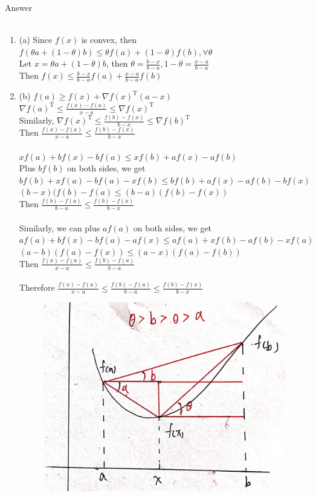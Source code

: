 \documentclass{article}
\theoremstyle{definition}
\theoremstyle{definition}
\theoremstyle{remark}
\begin{document}
{\bf{Answer
    \\\\\begin{enumerate}
    \item (a)  Since $f(x)$ is convex, then $f(\theta a+(1-\theta)b)\leq\theta f(a)+(1-\theta)f(b), \forall \theta$
    \\Let $x=\theta a+(1-\theta)b$, then $\theta=\frac{b-x}{b-a},1-\theta=\frac{x-a}{b-a}$
    \\Then $f(x)\leq \frac{b-x}{b-a}f(a)+\frac{x-a}{b-a}f(b)$
    \item (b) $f(a)\geq f(x)+\nabla f(x)^\mathrm{T}(a-x)$
    \\$\nabla f(a)^\mathrm{T}\leq\frac{f(x)-f(a)}{x-a}\leq\nabla f(x)^\mathrm{T}$
    \\Similarly, $\nabla f(x)^\mathrm{T}\leq\frac{f(b)-f(x)}{b-x}\leq\nabla f(b)^\mathrm{T}$
    \\Then $\frac{f(x)-f(a)}{x-a}\leq\frac{f(b)-f(x)}{b-x}$
    \\\\$xf(a)+bf(x)-bf(a)\leq xf(b)+af(x)-af(b)$
    \\Plus $bf(b)$ on both sides, we get $bf(b)+xf(a)-bf(a)-xf(b)\leq bf(b)+af(x)-af(b)-bf(x)$
    \\$(b-x)(f(b)-f(a)\leq (b-a)(f(b)-f(x))$
    \\Then $\frac{f(b)-f(a)}{b-a}\leq\frac{f(b)-f(x)}{b-x}$
    \\\\Similarly, we can plus $af(a)$ on both sides, we get $af(a)+bf(x)-bf(a)-af(x)\leq af(a)+xf(b)-af(b)-xf(a)$
    \\$(a-b)(f(a)-f(x))\leq(a-x)(f(a)-f(b))$
    \\Then $\frac{f(x)-f(a)}{x-a}\leq\frac{f(b)-f(a)}{b-a}$  
    \\\\Therefore $\frac{f(x)-f(a)}{x-a}\leq\frac{f(b)-f(a)}{b-a}\leq\frac{f(b)-f(x)}{b-x}$ 
    \begin{figure}[H]
        \centering
        \includegraphics[scale=0.25]{P1.jpg}

\end{figure}
\end{enumerate}}}
\end{document}
